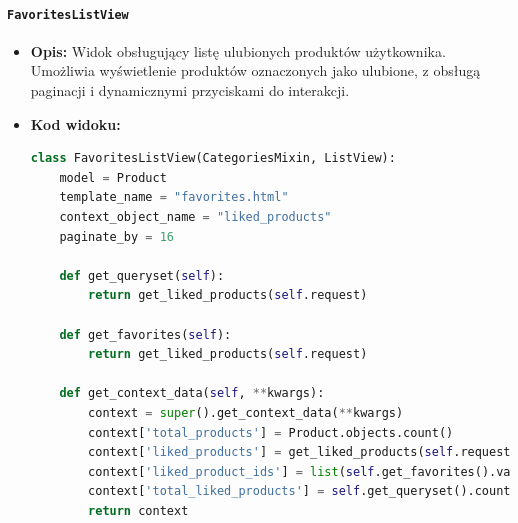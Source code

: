 \documentclass[12pt,a4paper,oneside]{article}
\theoremstyle{definition}
\numberwithin{equation}{section}
\begin{document}
\paragraph{\texttt{FavoritesListView}}
\begin{itemize}
    \item \textbf{Opis:} Widok obsługujący listę ulubionych produktów użytkownika. Umożliwia wyświetlenie produktów oznaczonych jako ulubione,
    z obsługą paginacji i dynamicznymi przyciskami do interakcji.
    \item \textbf{Kod widoku:}
    \begin{lstlisting}[language=Python, caption=FavoritesListView]
class FavoritesListView(CategoriesMixin, ListView):
    model = Product
    template_name = "favorites.html"
    context_object_name = "liked_products"
    paginate_by = 16

    def get_queryset(self):
        return get_liked_products(self.request)

    def get_favorites(self):
        return get_liked_products(self.request)

    def get_context_data(self, **kwargs):
        context = super().get_context_data(**kwargs)
        context['total_products'] = Product.objects.count()
        context['liked_products'] = get_liked_products(self.request)
        context['liked_product_ids'] = list(self.get_favorites().values_list('id', flat=True))
        context['total_liked_products'] = self.get_queryset().count()
        return context
    \end{lstlisting}


\end{itemize}
\end{document}
